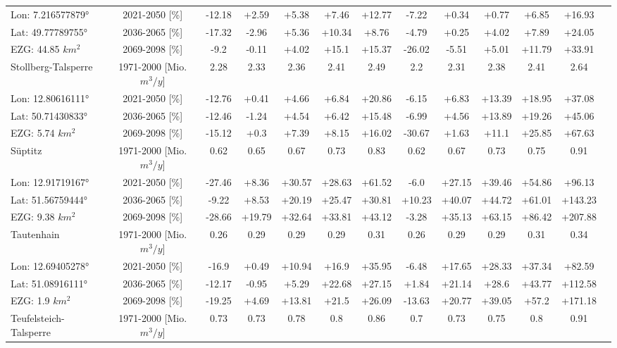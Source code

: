 \begin{longtable}{@{\extracolsep{\fill}}lc|ccccc||cccccc}
\cline{2-12} 
Lon: 7.216577879° & 2021-2050 [\%]  & -12.18 & +2.59 & +5.38 & +7.46 & +12.77 & -7.22 & +0.34 & +0.77 & +6.85 & +16.93\\ 
Lat: 49.77789755° & 2036-2065 [\%]  & -17.32 & -2.96 & +5.36 & +10.34 & +8.76 & -4.79 & +0.25 & +4.02 & +7.89 & +24.05\\ 
EZG: 44.85 $km^2$ & 2069-2098 [\%]  & -9.2 & -0.11 & +4.02 & +15.1 & +15.37 & -26.02 & -5.51 & +5.01 & +11.79 & +33.91\\ 
\hline 
Stollberg-Talsperre & 1971-2000 [Mio. $m^3/y$]  & 2.28 & 2.33 & 2.36 & 2.41 & 2.49 & 2.2 & 2.31 & 2.38 & 2.41 & 2.64\\ 
\cline{2-12} 
Lon: 12.80616111° & 2021-2050 [\%]  & -12.76 & +0.41 & +4.66 & +6.84 & +20.86 & -6.15 & +6.83 & +13.39 & +18.95 & +37.08\\ 
Lat: 50.71430833° & 2036-2065 [\%]  & -12.46 & -1.24 & +4.54 & +6.42 & +15.48 & -6.99 & +4.56 & +13.89 & +19.26 & +45.06\\ 
EZG: 5.74 $km^2$ & 2069-2098 [\%]  & -15.12 & +0.3 & +7.39 & +8.15 & +16.02 & -30.67 & +1.63 & +11.1 & +25.85 & +67.63\\ 
\hline 
Süptitz & 1971-2000 [Mio. $m^3/y$]  & 0.62 & 0.65 & 0.67 & 0.73 & 0.83 & 0.62 & 0.67 & 0.73 & 0.75 & 0.91\\ 
\cline{2-12} 
Lon: 12.91719167° & 2021-2050 [\%]  & -27.46 & +8.36 & +30.57 & +28.63 & +61.52 & -6.0 & +27.15 & +39.46 & +54.86 & +96.13\\ 
Lat: 51.56759444° & 2036-2065 [\%]  & -9.22 & +8.53 & +20.19 & +25.47 & +30.81 & +10.23 & +40.07 & +44.72 & +61.01 & +143.23\\ 
EZG: 9.38 $km^2$ & 2069-2098 [\%]  & -28.66 & +19.79 & +32.64 & +33.81 & +43.12 & -3.28 & +35.13 & +63.15 & +86.42 & +207.88\\ 
\hline 
Tautenhain & 1971-2000 [Mio. $m^3/y$]  & 0.26 & 0.29 & 0.29 & 0.29 & 0.31 & 0.26 & 0.29 & 0.29 & 0.31 & 0.34\\ 
\cline{2-12} 
Lon: 12.69405278° & 2021-2050 [\%]  & -16.9 & +0.49 & +10.94 & +16.9 & +35.95 & -6.48 & +17.65 & +28.33 & +37.34 & +82.59\\ 
Lat: 51.08916111° & 2036-2065 [\%]  & -12.17 & -0.95 & +5.29 & +22.68 & +27.15 & +1.84 & +21.14 & +28.6 & +43.77 & +112.58\\ 
EZG: 1.9 $km^2$ & 2069-2098 [\%]  & -19.25 & +4.69 & +13.81 & +21.5 & +26.09 & -13.63 & +20.77 & +39.05 & +57.2 & +171.18\\ 
\hline 
Teufelsteich-Talsperre & 1971-2000 [Mio. $m^3/y$]  & 0.73 & 0.73 & 0.78 & 0.8 & 0.86 & 0.7 & 0.73 & 0.75 & 0.8 & 0.91\\ 

\end{longtable}
